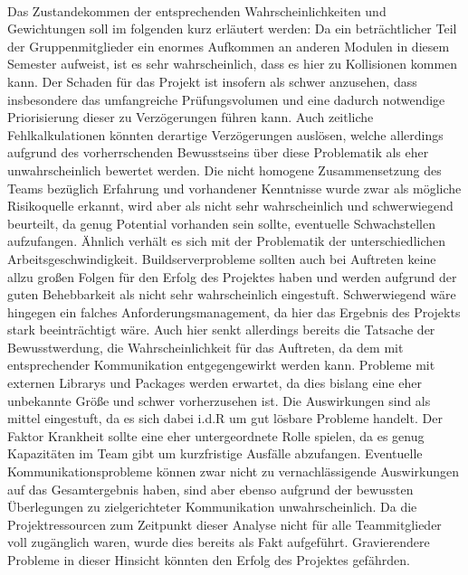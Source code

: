 \ \\
\newline
Das Zustandekommen der entsprechenden Wahrscheinlichkeiten und Gewichtungen soll im folgenden kurz erläutert werden:
\newline\newline
Da ein beträchtlicher Teil der Gruppenmitglieder ein enormes Aufkommen an anderen Modulen in diesem Semester aufweist, ist es sehr wahrscheinlich, dass es hier zu Kollisionen kommen kann. Der Schaden für das Projekt ist insofern als schwer anzusehen, dass insbesondere das umfangreiche Prüfungsvolumen und eine dadurch notwendige Priorisierung dieser zu Verzögerungen führen kann. 
Auch zeitliche Fehlkalkulationen könnten derartige Verzögerungen auslösen, welche allerdings aufgrund des vorherrschenden Bewusstseins über diese Problematik als eher unwahrscheinlich bewertet werden. Die nicht homogene Zusammensetzung des Teams bezüglich Erfahrung und vorhandener Kenntnisse wurde zwar als mögliche Risikoquelle erkannt, wird aber als nicht sehr wahrscheinlich und schwerwiegend beurteilt, da genug Potential vorhanden sein sollte, eventuelle Schwachstellen aufzufangen. Ähnlich verhält es sich mit der Problematik der unterschiedlichen Arbeitsgeschwindigkeit.
Buildserverprobleme sollten auch bei Auftreten keine allzu großen Folgen für den Erfolg des Projektes haben und werden aufgrund der guten Behebbarkeit als nicht sehr wahrscheinlich eingestuft.
Schwerwiegend wäre hingegen ein falches Anforderungsmanagement, da hier das Ergebnis des Projekts stark beeinträchtigt wäre. Auch hier senkt allerdings bereits die Tatsache der Bewusstwerdung, die Wahrscheinlichkeit für das Auftreten, da dem mit entsprechender Kommunikation entgegengewirkt werden kann.
\newline\newline
Probleme mit externen Librarys und Packages werden erwartet, da dies bislang eine eher unbekannte Größe und schwer vorherzusehen ist. Die Auswirkungen sind als mittel eingestuft, da es sich dabei i.d.R um gut lösbare Probleme handelt. Der Faktor Krankheit sollte eine eher untergeordnete Rolle spielen, da es genug Kapazitäten im Team gibt um kurzfristige Ausfälle abzufangen.
\newline\newline
Eventuelle Kommunikationsprobleme können zwar nicht zu vernachlässigende Auswirkungen auf das Gesamtergebnis haben, sind aber ebenso aufgrund der bewussten Überlegungen zu zielgerichteter Kommunikation unwahrscheinlich.
\newline\newline
Da die Projektressourcen zum Zeitpunkt dieser Analyse nicht für alle Teammitglieder voll zugänglich waren, wurde dies bereits als Fakt aufgeführt. Gravierendere Probleme in dieser Hinsicht könnten den Erfolg des Projektes gefährden.


\pagebreak
